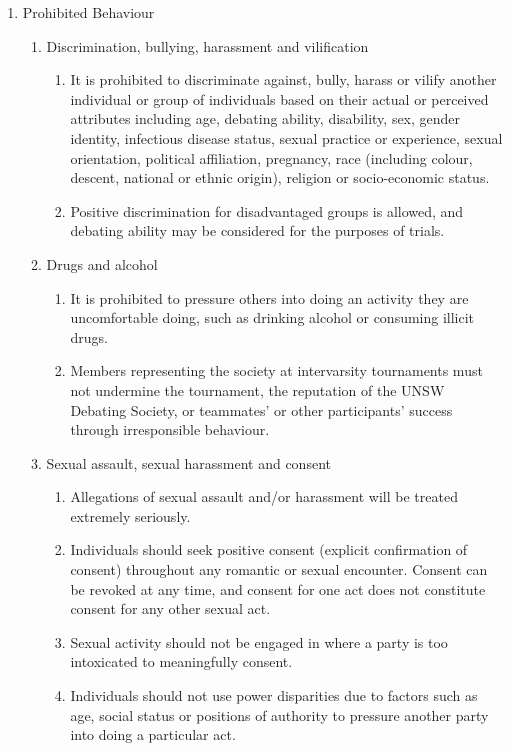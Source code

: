 \begin{enumerate}
\item Prohibited Behaviour
  \begin{enumerate}
  \item Discrimination, bullying, harassment and vilification
    \begin{enumerate}
    \item It is prohibited to discriminate against, bully, harass or vilify another individual or group of individuals based on their actual or perceived attributes including age, debating ability, disability, sex, gender identity, infectious disease status, sexual practice or experience, sexual orientation, political affiliation, pregnancy, race (including colour, descent, national or ethnic origin), religion or socio-economic status.
    \item Positive discrimination for disadvantaged groups is allowed, and debating ability may be considered for the purposes of trials.
    \end{enumerate}
  \item Drugs and alcohol
    \begin{enumerate}
    \item It is prohibited to pressure others into doing an activity they are uncomfortable doing, such as drinking alcohol or consuming illicit drugs.
    \item Members representing the society at intervarsity tournaments must not undermine the tournament, the reputation of the UNSW Debating Society, or teammates’ or other participants’ success through irresponsible behaviour.
    \end{enumerate}
  \item Sexual assault, sexual harassment and consent
    \begin{enumerate}
    \item Allegations of sexual assault and/or harassment will be treated extremely seriously.
    \item Individuals should seek positive consent (explicit confirmation of consent) throughout any romantic or sexual encounter. Consent can be revoked at any time, and consent for one act does not constitute consent for any other sexual act.
    \item Sexual activity should not be engaged in where a party is too intoxicated to meaningfully consent.
    \item Individuals should not use power disparities due to factors such as age, social status or positions of authority to pressure another party into doing a particular act.
    \end{enumerate}
  \end{enumerate}


\end{enumerate}
